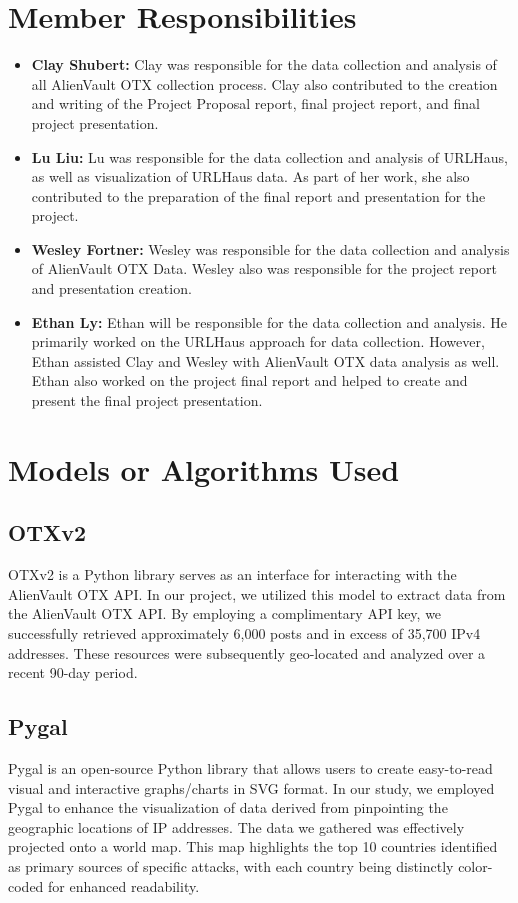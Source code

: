 \documentclass[letterpaper, 10 pt, conference]{ieeeconf}  %
\begin{document}
\section{Member Responsibilities}

\begin{itemize}
    \item \textbf{Clay Shubert:} Clay was responsible for the data collection and analysis of all AlienVault OTX collection process. Clay also contributed to the creation and writing of the Project Proposal report, final project report, and final project presentation.
    \item \textbf{Lu Liu:} Lu was responsible for the data collection and analysis of URLHaus, as well as visualization of URLHaus data. As part of her work, she also contributed to the preparation of the final report and presentation for the project.
    \item \textbf{Wesley Fortner:} Wesley was responsible for the data collection and analysis of AlienVault OTX Data. Wesley also was responsible for the project report and presentation creation.
    \item \textbf{Ethan Ly:} Ethan will be responsible for the data collection and analysis. He primarily worked on the URLHaus approach for data collection. However, Ethan assisted Clay and Wesley with AlienVault OTX data analysis as well. Ethan also worked on the project final report and helped to create and present the final project presentation.
\end{itemize}

\section{Models or Algorithms Used}

    \subsection*{OTXv2}
    OTXv2 is a Python library serves as an interface for interacting with the AlienVault OTX API. In our project, we utilized this model to extract data from the AlienVault OTX API. By employing a complimentary API key, we successfully retrieved approximately 6,000 posts and in excess of 35,700 IPv4 addresses. These resources were subsequently geo-located and analyzed over a recent 90-day period.

    \subsection*{Pygal}
    Pygal is an open-source Python library that allows users to create easy-to-read visual and interactive graphs/charts in SVG format. In our study, we employed Pygal to enhance the visualization of data derived from pinpointing the geographic locations of IP addresses. 
    The data we gathered was effectively projected onto a world map. This map highlights the top 10 countries identified as primary sources of specific attacks, with each country being distinctly color-coded for enhanced readability.
    
\end{document}
